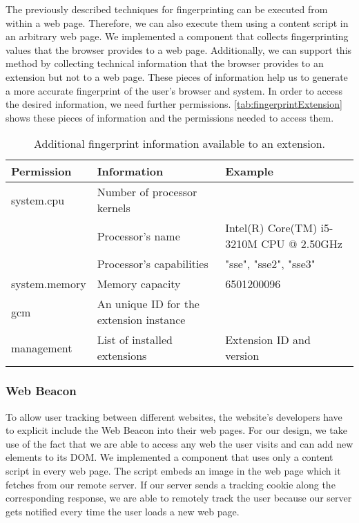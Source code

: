 	The previously described techniques for fingerprinting can be executed from within a web page. Therefore, we can also execute them using a content script in an arbitrary web page. We implemented a component that collects fingerprinting values that the browser provides to a web page. Additionally, we can support this method by collecting technical information that the browser provides to an extension but not to a web page. These pieces of information help us to generate a more accurate fingerprint of the user's browser and system. In order to access the desired information, we need further permissions. \autoref{tab:fingerprintExtension} shows these pieces of information and the permissions needed to access them. 
	
	\begin{table}[h]
		\begin{tabular}{|l|l|l|} \hline
			\textbf{Permission} & \textbf{Information} & \textbf{Example} \\ \hline
			system.cpu & Number of processor kernels & \\
			& Processor's name & Intel(R) Core(TM) i5-3210M CPU @ 2.50GHz \\
			& Processor's capabilities & "sse", "sse2", "sse3"  \\ \hline
			system.memory & Memory capacity & 6501200096 \\ \hline
			gcm & An unique ID for the extension instance & \\ \hline
			management & List of installed extensions & Extension ID and version \\ \hline
		\end{tabular}
		\caption{Additional fingerprint information available to an extension.}
		\label{tab:fingerprintExtension}
	\end{table} 
	
\subsubsection{Web Beacon}
\label{sec:webBeacon}

	To allow user tracking between different websites, the website's developers have to explicit include the Web Beacon into their web pages. For our design, we take use of the fact that we are able to access any web the user visits and can add new elements to its DOM. We implemented a component that uses only a content script in every web page. The script embeds an image in the web page which it fetches from our remote server. If our server sends a tracking cookie along the corresponding response, we are able to remotely track the user because our server gets notified every time the user loads a new web page.  

